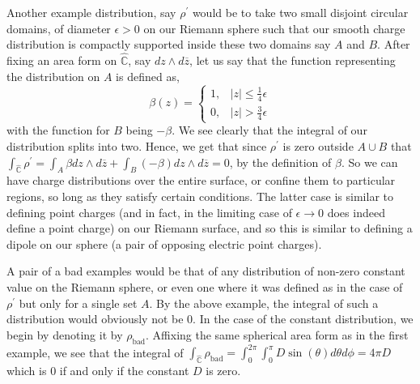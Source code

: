 \documentclass[11pt]{report}
\theoremstyle{definition}
\begin{document}
Another example distribution, say $\rho^{\prime}$ would be to take two small disjoint circular domains, of diameter $\epsilon > 0$ on our Riemann sphere such that our smooth charge distribution is compactly supported inside these two domains say $A$ and $B$. After fixing an area form on $\hat{\mathbb{C}}$, say $dz \wedge d\overline{z}$, let us say that the function representing the distribution on $A$ is defined as,
\[
\beta(z)=
\begin{cases}
  1, &|z| \leq \frac{1}{4}\epsilon \\
  0, &|z| > \frac{3}{4}\epsilon
\end{cases}
\]
with the function for $B$ being $-\beta$. We see clearly that the integral of our distribution splits into two. Hence, we get that since $\rho^{\prime}$ is zero outside $A \cup B$ that $\int_{\hat{\mathbb{C}}} \rho^{\prime} = \int_A \beta dz\wedge d\overline{z} + \int_B (-\beta) dz\wedge d\overline{z} = 0$, by the definition of $\beta$. So we can have charge distributions over the entire surface, or confine them to particular regions, so long as they satisfy certain conditions. The latter case is similar to defining point charges (and in fact, in the limiting case of $\epsilon \rightarrow 0$ does indeed define a point charge) on our Riemann surface, and so this is similar to defining a dipole on our sphere (a pair of opposing electric point charges). 

A pair of a bad examples would be that of any distribution of non-zero constant value on the Riemann sphere, or even one where it was defined as in the case of $\rho^{\prime}$ but only for a single set $A$. By the above example, the integral of such a distribution would obviously not be $0$. In the case of the constant distribution, we begin by denoting it by $\rho_{\text{bad}}$. Affixing the same spherical area form as in the first example, we see that the integral of $\int_{\hat{\mathbb{C}}} \rho_{\text{bad}} = \int_0^{2\pi}\int_0^{\pi}D\sin(\theta)d\theta d\phi = 4\pi D$ which is $0$ if and only if the constant $D$ is zero.
\end{document}
